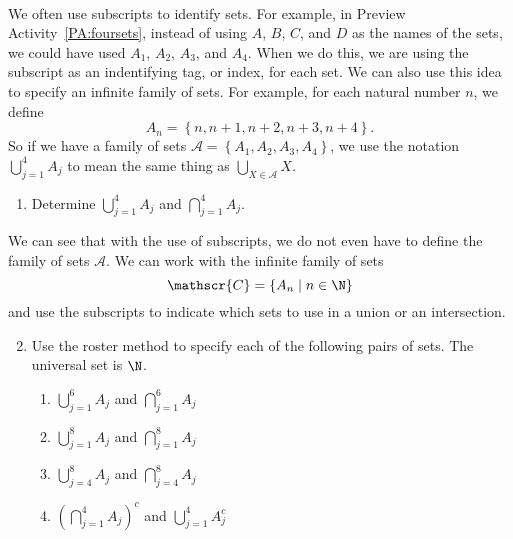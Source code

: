 \begin{previewactivity} \label{PA:indexfamily} \hfill \\
We often use subscripts to identify sets.  For example, in 
Preview Activity~\ref{PA:foursets}, instead of using $A$, $B$, $C$, and $D$ as the names of the sets, we could have used $A_1$, $A_2$, $A_3$, and $A_4$.  When we do this, we are using the subscript as an indentifying tag, or index, for each set.  We can also use this idea to specify an infinite family of sets.  For example, for each natural number $n$, we define
\[
A_n = \left\{ n, n+1, n+2, n+3, n+4 \right\}\!.
\]
So if we have a family of sets $\mathscr{A} = \left\{ A_1, A_2, A_3, A_4 \right\}$, we use the notation $\bigcup\limits_{j=1}^{4}A_j$ to mean the same thing as 
$\bigcup\limits_{X \in \mathscr{A}}^{}X$\!.
\begin{enumerate}
\item Determine $\bigcup\limits_{j=1}^{4}A_j$  and  $\bigcap\limits_{j=1}^{4}A_j$\!.
\end{enumerate}
We can see that with the use of subscripts, we do not even have to define the family of sets 
$\mathscr{A}$.  We can work with the infinite family of sets
\[
\mathscr{C} = \left\{ A_n \mid n \in \N \right\}
\]
and use the subscripts to indicate which sets to use in a union or an intersection.

\begin{enumerate} \setcounter{enumi}{1}
\item Use the roster method to specify each of the following pairs of sets.  The universal set is 
$\N$.
\begin{multicols}{2}
\begin{enumerate}
\item $\bigcup\limits_{j=1}^{6}A_j$  and  $\bigcap\limits_{j=1}^{6}A_j$
\item $\bigcup\limits_{j=1}^{8}A_j$  and  $\bigcap\limits_{j=1}^{8}A_j$
\item $\bigcup\limits_{j=4}^{8}A_j$  and  $\bigcap\limits_{j=4}^{8}A_j$
\item $\left( \bigcap\limits_{j=1}^{4}A_j \right)^c$  and  $\bigcup\limits_{j=1}^{4}A_j^c$
\end{enumerate}
\end{multicols}
\end{enumerate}
\end{previewactivity}
\hbreak
\endinput















\begin{enumerate}
\item Without using the associative law, how would you define $A \cup B \cup C$?  That is, how would you complete the following sentence:
\begin{list}{}
\item An element $x$ in the universal set is in $A \cup B \cup C$ if and only if \ldots
\end{list}
\end{enumerate}
